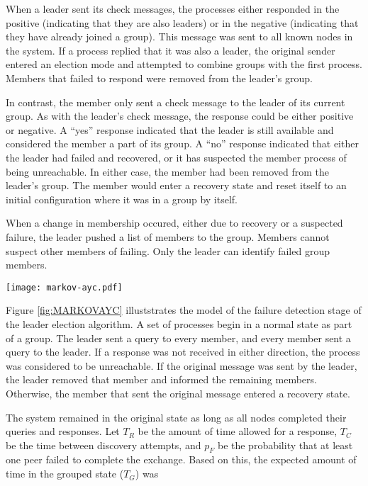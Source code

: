 When a leader sent its check messages, the processes either responded in the positive (indicating that they are also leaders) or in the
negative (indicating that they have already joined a group).
This message was sent to all known nodes in the system.
If a process replied that it was also a leader, the original sender entered an election mode and attempted to combine groups with the first process.
Members that failed to respond were removed from the leader's group.

In contrast, the member only sent a check message to the leader of its current group.
As with the leader's check message, the response could be either positive or negative.
A ``yes'' response indicated that the leader is still available and considered the member a part of its group.
A ``no'' response indicated that either the leader had failed and recovered, or it has suspected the member process of being unreachable.
In either case, the member had been removed from the leader's group.
The member would enter a recovery state and reset itself to an initial configuration where it was in a group by itself.

When a change in membership occured, either due to recovery or a suspected failure, the leader pushed a list of members to the group.
Members cannot suspect other members of failing.
Only the leader can identify failed group members.

\begin{figure*}
\centering
\texttt{[image: markov-ayc.pdf]}
\caption{A diagram showing a partial Markov chain for failure detection}
\label{fig:MARKOVAYC}
\end{figure*}

Figure \ref{fig:MARKOVAYC} illuststrates the model of the failure detection stage of the leader election algorithm.
A set of processes begin in a normal state as part of a group.
The leader sent a query to every member, and every member sent a query to the leader.
If a response was not received in either direction, the process was considered to be unreachable.
If the original message was sent by the leader, the leader removed that member and informed the remaining members.
Otherwise, the member that sent the original message entered a recovery state.

The system remained in the original state as long as all nodes completed their queries and responses.
Let $T_{R}$ be the amount of time allowed for a response, $T_{C}$ be the time between discovery attempts, and $p_{F}$ be the probability that at least one peer failed to complete the exchange.
Based on this, the expected amount of time in the grouped state ($T_{G}$) was

